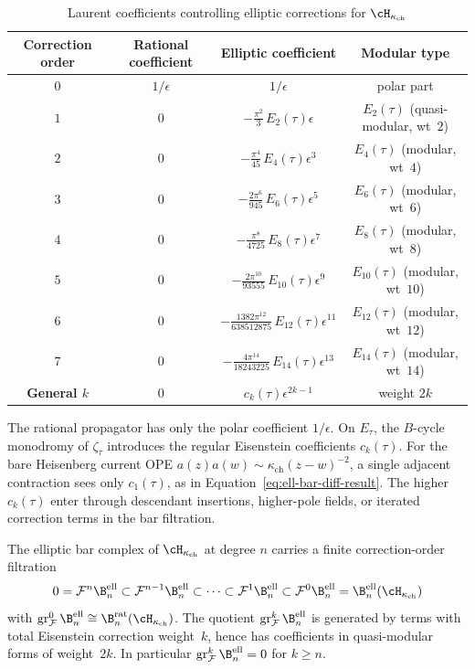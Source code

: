 \begin{table}[ht]
\centering
\caption{Laurent coefficients controlling elliptic corrections
for $\cH_{\kappa_{\mathrm{ch}}}$}
\label{tab:ell-vs-rat-bar}
\begin{tabular}{|c|c|c|c|}
\hline
\textbf{Correction order} & \textbf{Rational coefficient}
& \textbf{Elliptic coefficient}
& \textbf{Modular type} \\
\hline
$0$ & $1/\epsilon$ & $1/\epsilon$ & polar part \\
\hline
$1$ & $0$ & $-\frac{\pi^2}{3}\,E_2(\tau)\epsilon$
& $E_2(\tau)$ (quasi-modular, wt~$2$) \\
\hline
$2$ & $0$ & $-\frac{\pi^4}{45}\,E_4(\tau)\epsilon^3$
& $E_4(\tau)$ (modular, wt~$4$) \\
\hline
$3$ & $0$ & $-\frac{2\pi^6}{945}\,E_6(\tau)\epsilon^5$
& $E_6(\tau)$ (modular, wt~$6$) \\
\hline
$4$ & $0$ & $-\frac{\pi^8}{4725}\,E_8(\tau)\epsilon^7$
& $E_8(\tau)$ (modular, wt~$8$) \\
\hline
$5$ & $0$ & $-\frac{2\pi^{10}}{93555}\,E_{10}(\tau)\epsilon^9$
& $E_{10}(\tau)$ (modular, wt~$10$) \\
\hline
$6$ & $0$ & $-\frac{1382\pi^{12}}{638512875}\,E_{12}(\tau)\epsilon^{11}$
& $E_{12}(\tau)$ (modular, wt~$12$) \\
\hline
$7$ & $0$ & $-\frac{4\pi^{14}}{18243225}\,E_{14}(\tau)\epsilon^{13}$
& $E_{14}(\tau)$ (modular, wt~$14$) \\
\hline
\textbf{General $k$}
& $0$ & $c_k(\tau)\epsilon^{2k-1}$
& weight $2k$ \\
\hline
\end{tabular}
\end{table}

\noindent
The rational propagator has only the polar coefficient $1/\epsilon$.
On $E_\tau$, the $B$-cycle monodromy of $\zeta_\tau$ introduces the
regular Eisenstein coefficients $c_k(\tau)$. For the bare Heisenberg
current OPE $a(z)a(w)\sim\kappa_{\mathrm{ch}}(z-w)^{-2}$, a single
adjacent contraction sees only $c_1(\tau)$, as in
Equation~\eqref{eq:ell-bar-diff-result}. The higher $c_k(\tau)$ enter
through descendant insertions, higher-pole fields, or iterated
correction terms in the bar filtration.

\begin{proposition}\label{prop:ell-bar-decomposition}
The elliptic bar complex of $\cH_{\kappa_{\mathrm{ch}}}$ at degree $n$
carries a finite correction-order filtration
\[
0=\mathcal F^n\B^{\mathrm{ell}}_n
\subset \mathcal F^{n-1}\B^{\mathrm{ell}}_n
\subset\cdots\subset \mathcal F^1\B^{\mathrm{ell}}_n
\subset \mathcal F^0\B^{\mathrm{ell}}_n
=\B^{\mathrm{ell}}_n(\cH_{\kappa_{\mathrm{ch}}})
\]
with $\operatorname{gr}^0_{\mathcal F}\B^{\mathrm{ell}}_n
\cong \B^{\mathrm{rat}}_n(\cH_{\kappa_{\mathrm{ch}}})$. The quotient
$\operatorname{gr}^k_{\mathcal F}\B^{\mathrm{ell}}_n$ is generated by
terms with total Eisenstein correction weight~$k$, hence has
coefficients in quasi-modular forms of weight~$2k$. In particular
$\operatorname{gr}^k_{\mathcal F}\B^{\mathrm{ell}}_n=0$ for $k\geq n$.
\end{proposition}

